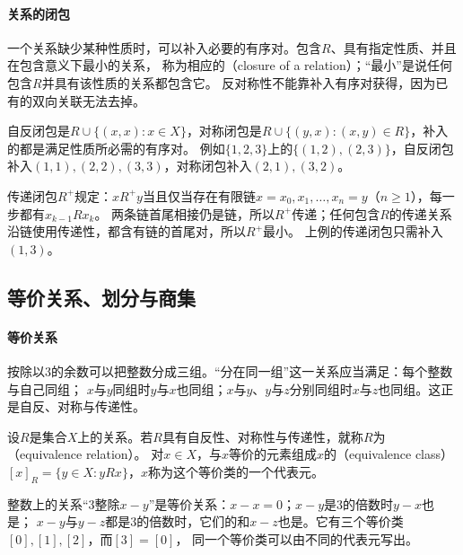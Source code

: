 \paragraph{关系的闭包}
一个关系缺少某种性质时，可以补入必要的有序对。包含$R$、具有指定性质、并且在包含意义下最小的关系，
称为相应的（closure of a relation）；“最小”是说任何包含$R$并具有该性质的关系都包含它。
反对称性不能靠补入有序对获得，因为已有的双向关联无法去掉。

自反闭包是$R\cup\{(x,x):x\in X\}$，对称闭包是$R\cup\{(y,x):(x,y)\in R\}$，补入的都是满足性质所必需的有序对。
例如$\{1,2,3\}$上的$\{(1,2),(2,3)\}$，自反闭包补入$(1,1),(2,2),(3,3)$，对称闭包补入$(2,1),(3,2)$。

传递闭包$R^+$规定：$xR^+y$当且仅当存在有限链$x=x_0,x_1,\ldots,x_n=y$（$n\geq1$），每一步都有$x_{k-1}Rx_k$。
两条链首尾相接仍是链，所以$R^+$传递；任何包含$R$的传递关系沿链使用传递性，都含有链的首尾对，所以$R^+$最小。
上例的传递闭包只需补入$(1,3)$。

\subsection{等价关系、划分与商集}
\label{sec:prelim-equivalence-relations}

\paragraph{等价关系}
按除以$3$的余数可以把整数分成三组。“分在同一组”这一关系应当满足：每个整数与自己同组；
$x$与$y$同组时$y$与$x$也同组；$x$与$y$、$y$与$z$分别同组时$x$与$z$也同组。这正是自反、对称与传递性。
\begin{definition}[等价关系]
\label{def:prelim-equivalence-relation}
设$R$是集合$X$上的关系。若$R$具有自反性、对称性与传递性，就称$R$为（equivalence relation）。
对$x\in X$，与$x$等价的元素组成$x$的（equivalence class）
$[x]_R=\{y\in X:yRx\}$，$x$称为这个等价类的一个代表元。
\end{definition}
\begin{example}
\label{ex:sets-congruence-mod-three}
整数上的关系“$3$整除$x-y$”是等价关系：$x-x=0$；$x-y$是$3$的倍数时$y-x$也是；
$x-y$与$y-z$都是$3$的倍数时，它们的和$x-z$也是。它有三个等价类$[0],[1],[2]$，而$[3]=[0]$，
同一个等价类可以由不同的代表元写出。
\end{example}

